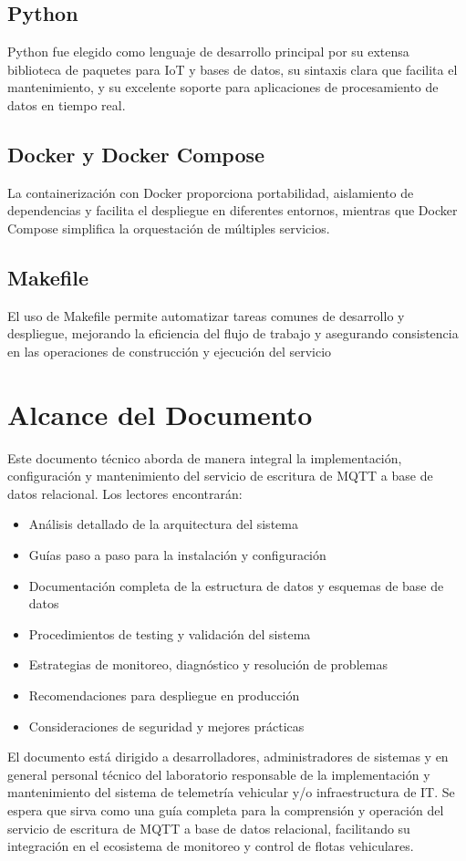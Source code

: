 \subsection{Python}
Python fue elegido como lenguaje de desarrollo principal por su extensa biblioteca de paquetes para IoT y bases de datos, su sintaxis clara que facilita el mantenimiento, y su excelente soporte para aplicaciones de procesamiento de datos en tiempo real.

\subsection{Docker y Docker Compose}
La containerización con Docker proporciona portabilidad, aislamiento de dependencias y facilita el despliegue en diferentes entornos, mientras que Docker Compose simplifica la orquestación de múltiples servicios.

\subsection{Makefile}
El uso de Makefile permite automatizar tareas comunes de desarrollo y despliegue, mejorando la eficiencia del flujo de trabajo y asegurando consistencia en las operaciones de construcción y ejecución del servicio

\section{Alcance del Documento}

Este documento técnico aborda de manera integral la implementación, configuración y mantenimiento del servicio de escritura de MQTT a base de datos relacional. Los lectores encontrarán:

\begin{itemize}[noitemsep]
    \item Análisis detallado de la arquitectura del sistema
    \item Guías paso a paso para la instalación y configuración
    \item Documentación completa de la estructura de datos y esquemas de base de datos
    \item Procedimientos de testing y validación del sistema
    \item Estrategias de monitoreo, diagnóstico y resolución de problemas
    \item Recomendaciones para despliegue en producción
    \item Consideraciones de seguridad y mejores prácticas
\end{itemize}

El documento está dirigido a desarrolladores, administradores de sistemas y en general personal técnico del laboratorio responsable de la implementación y mantenimiento del sistema de telemetría vehicular y/o
infraestructura de IT. Se espera que sirva como una guía completa para la comprensión y operación del servicio de escritura de MQTT a base de datos relacional, facilitando su integración en el ecosistema de monitoreo y control de flotas vehiculares.
